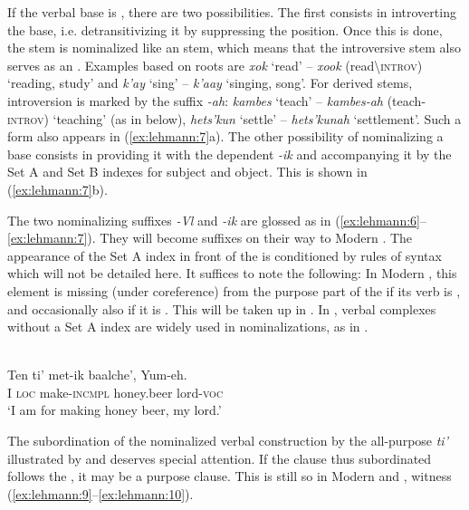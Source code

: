 \documentclass[output=paper]{langsci/langscibook}
\begin{document}
If the verbal base is , there are two possibilities. The first consists in introverting the base, i.e. detransitivizing it by suppressing the  position. Once this is done, the stem is nominalized like an   stem, which means that the introversive stem also serves as an . Examples based on  roots are \textit{xok} ‘read’ – \textit{xook} (read{\textbackslash}\textsc{introv}) ‘reading, study’ and \textit{k’ay} ‘sing’ – \textit{k’aay} ‘singing, song’. For derived  stems, introversion is marked by the suffix \textit{{}-ah}: \textit{kambes} ‘teach’ – \textit{kambes-ah} (teach-\textsc{introv}) ‘teaching’ (as in  below), \textit{hets’kun} ‘settle’ – \textit{hets’kunah} ‘settlement’. Such a form also appears in (\ref{ex:lehmann:7}a). The other possibility of nominalizing a  base consists in providing it with the dependent  \textit{{}-ik} and accompanying it by the Set A and Set B indexes for subject and object. This is shown in (\ref{ex:lehmann:7}b).

The two nominalizing suffixes \textit{{}-Vl} and \textit{{}-ik} are glossed as  in (\ref{ex:lehmann:6}–\ref{ex:lehmann:7}). They will become  suffixes on their way to Modern . The appearance of the Set A index in front of the  is conditioned by rules of syntax which will not be detailed here. It suffices to note the following: In Modern  , this element is missing (under coreference) from the purpose part of the  if its verb is , and occasionally also if it is . This will be taken up in . In ,  verbal complexes without a Set A index are widely used in nominalizations, as in .
 

\ea
\label{ex:lehmann:8}
\\
\gll   Ten  ti’   met-ik   baalche’,   Yum-eh.\\
I  \textsc{loc}  make-\textsc{incmpl}  honey.beer  lord-\textsc{voc} \\
\glt ‘I am for making honey beer, my lord.’ \citep[28]{Bruce1974} 
\z

The subordination of the nominalized verbal construction by the all-purpose  \textit{ti’} illustrated by  and  deserves special attention. If the clause thus subordinated follows the , it may be a purpose clause. This is still so in Modern  and , witness (\ref{ex:lehmann:9}–\ref{ex:lehmann:10}).
\end{document}
